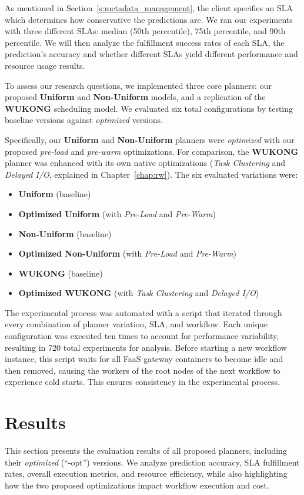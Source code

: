 As mentioned in Section~\ref{s:metadata_management}, the client specifies an SLA which determines how conservative the predictions are. We ran our experiments with three different SLAs: median (50th percentile), 75th percentile, and 90th percentile. We will then analyze the fulfillment success rates of each SLA, the prediction's accuracy and whether different SLAs yield different performance and resource usage results.

To assess our research questions, we implemented three core planners: our proposed \textbf{Uniform} and \textbf{Non-Uniform} models, and a replication of the \textbf{WUKONG} scheduling model. We evaluated six total configurations by testing baseline versions against \textit{optimized} versions.

Specifically, our \textbf{Uniform} and \textbf{Non-Uniform} planners were \textit{optimized} with our proposed \textit{pre-load} and \textit{pre-warm} optimizations. For comparison, the \textbf{WUKONG} planner was enhanced with its own native optimizations (\textit{Task Clustering} and \textit{Delayed I/O}, explained in Chapter~\ref{chap:rw}). The six evaluated variations were:
\begin{itemize}
    \item \textbf{Uniform} (baseline)
    \item \textbf{Optimized Uniform} (with \textit{Pre-Load} and \textit{Pre-Warm})
    \item \textbf{Non-Uniform} (baseline)
    \item \textbf{Optimized Non-Uniform} (with \textit{Pre-Load} and \textit{Pre-Warm})
    \item \textbf{WUKONG} (baseline)
    \item \textbf{Optimized WUKONG} (with \textit{Task Clustering} and \textit{Delayed I/O})
\end{itemize}

The experimental process was automated with a script that iterated through every combination of planner variation, SLA, and workflow. Each unique configuration was executed ten times to account for performance variability, resulting in 720 total experiments for analysis. Before starting a new workflow instance, this script waits for all FaaS gateway containers to become idle and then removed, causing the workers of the root nodes of the next workflow to experience cold starts. This ensures consistency in the experimental process.

\section{Results}
This section presents the evaluation results of all proposed planners, including their \textit{optimized} (“-opt”) versions. We analyze prediction accuracy, SLA fulfillment rates, overall execution metrics, and resource efficiency, while also highlighting how the two proposed optimizations impact workflow execution and cost.


